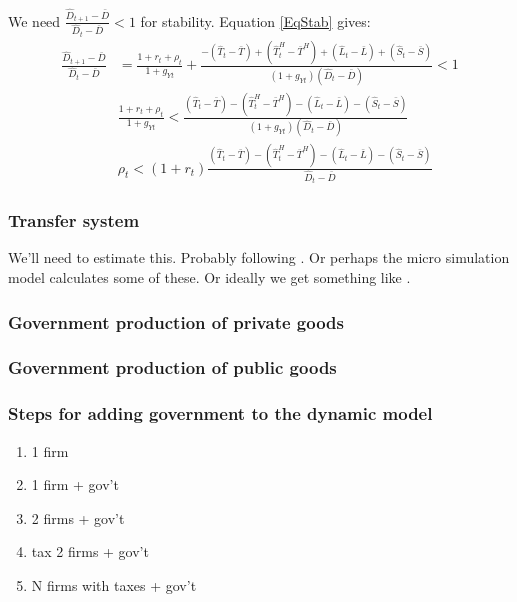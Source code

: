 \documentclass[letterpaper,12pt]{article}
\theoremstyle{definition}
\begin{document}
\begin{spacing}{1.5}
      We need $\frac{\hat D_{t+1} - \bar D}{\hat D_{t} - \bar D} < 1$ for stability.  Equation \eqref{EqStab} gives:
      \begin{align} 
        \frac{\hat D_{t+1} - \bar D}{\hat D_t -\bar D} & = \frac{1+r_t+\rho_t}{1+g_{Yt}}  + \frac{-(\hat T_t - \bar T) + (\hat T^H_t -\bar T^H) + (\hat L_t -\bar L) + (\hat S_t -\bar S)}{(1+g_{Yt})(\hat D_t -\bar D)} < 1 \nonumber \\
        & \frac{1+r_t+\rho_t}{1+g_{Yt}}  < \frac{(\hat T_t - \bar T) - (\hat T^H_t -\bar T^H) - (\hat L_t -\bar L) - (\hat S_t -\bar S)}{(1+g_{Yt})(\hat D_t -\bar D)} \nonumber \\
        & \rho_t  < (1+r_t)\frac{(\hat T_t - \bar T) - (\hat T^H_t -\bar T^H) - (\hat L_t -\bar L) - (\hat S_t -\bar S)}{\hat D_t -\bar D}
      \end{align} 

    \subsubsection{Transfer system}
      We'll need to estimate this.  Probably following \citet{FR1993}.  Or perhaps the micro simulation model calculates some of these.  Or ideally we get something like \citet{KotlikoffXXXX}.

    \subsubsection{Government production of private goods}

    \subsubsection{Government production of public goods}

    \subsubsection{Steps for adding government to the dynamic model}
      \begin{enumerate}
      \item 1 firm
      \item 1 firm + gov't
      \item 2 firms + gov't
      \item tax 2 firms + gov't
      \item N firms with taxes + gov't
      \end{enumerate}


\end{spacing}
\end{document}
